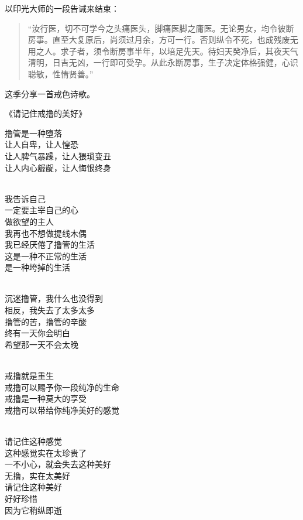 \documentclass{ctexart}
\begin{document}
以印光大师的一段告诫来结束：

\begin{quote}
    “汝行医，切不可学今之头痛医头，脚痛医脚之庸医。无论男女，均令彼断房事。直至大复原后，尚须过月余，方可一行。否则纵令不死，也成残废无用之人。求子者，须令断房事半年，以培足先天。待妇天癸净后，其夜天气清明，日吉无凶，一行即可受孕。从此永断房事，生子决定体格强健，心识聪敏，性情贤善。”
\end{quote}

这季分享一首戒色诗歌。

\begin{center}
    《请记住戒撸的美好》\it
    \begin{multicols}{2}
        撸管是一种堕落 \\ 让人自卑，让人惶恐 \\ 让人脾气暴躁，让人猥琐变丑 \\ 让人内心龌龊，让人悔恨终身

        ~\\

        我告诉自己 \\ 一定要主宰自己的心 \\ 做欲望的主人 \\ 我再也不想做提线木偶 \\ 我已经厌倦了撸管的生活 \\ 这是一种不正常的生活 \\ 是一种垮掉的生活

        ~\\

        沉迷撸管，我什么也没得到 \\ 相反，我失去了太多太多 \\ 撸管的苦，撸管的辛酸 \\ 终有一天你会明白 \\ 希望那一天不会太晚

        ~\\

        戒撸就是重生 \\ 戒撸可以赐予你一段纯净的生命 \\ 戒撸是一种莫大的享受 \\ 戒撸可以带给你纯净美好的感觉

        ~\\

        请记住这种感觉 \\ 这种感觉实在太珍贵了 \\ 一不小心，就会失去这种美好 \\ 无撸，实在太美好 \\ 请记住这种美好 \\ 好好珍惜 \\ 因为它稍纵即逝
    \end{multicols}
\end{center}
\end{document}
